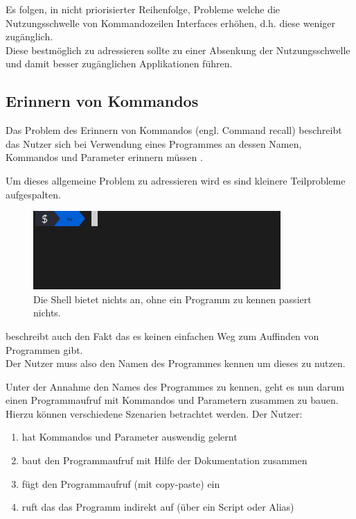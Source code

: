 \documentclass[oneside,bibliography=totocnumbered,BCOR=5mm]{scrbook}
\begin{document}
Es folgen, in nicht priorisierter Reihenfolge, Probleme welche die
Nutzungsschwelle von Kommandozeilen Interfaces erhöhen, d.h. diese weniger
zugänglich.
\\
Diese bestmöglich zu adressieren sollte zu einer Absenkung der Nutzungsschwelle
und damit besser zugänglichen Applikationen führen.

\subsection{Erinnern von Kommandos}

Das Problem des Erinnern von Kommandos (engl. Command recall) beschreibt das
Nutzer sich bei Verwendung eines Programmes an dessen Namen, Kommandos und
Parameter erinnern müssen \parencite{Raskin_2008}.


Um dieses allgemeine Problem zu adressieren wird es sind kleinere Teilprobleme
aufgespalten.

\medskip

\begin{figure}
  \centering
  \includegraphics[scale=0.5]{empty-prompt.png}
  \caption{Die Shell bietet nichts an, ohne ein Programm zu kennen passiert nichts.}
\end{figure}

\cite{Gentner_1996} beschreibt auch den Fakt das es keinen einfachen Weg zum
Auffinden von Programmen gibt.
\\
Der Nutzer muss also den Namen des Programmes kennen um dieses zu nutzen.

\smallskip

Unter der Annahme den Names des Programmes zu kennen, geht es nun darum einen
Programmaufruf mit Kommandos und Parametern zusammen zu bauen.
Hierzu können verschiedene Szenarien betrachtet werden.
Der Nutzer:

\begin{enumerate}
  \item hat Kommandos und Parameter auswendig gelernt
  \item baut den Programmaufruf mit Hilfe der Dokumentation zusammen
  \item fügt den Programmaufruf (mit copy-paste) ein
  \item ruft das das Programm indirekt auf (über ein Script oder Alias)
\end{enumerate}
\end{document}
